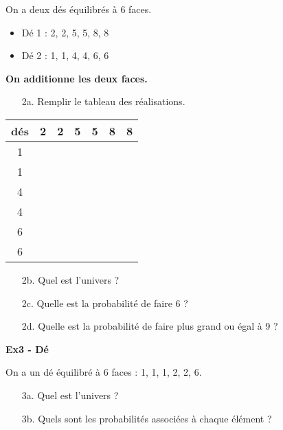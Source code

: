 \begin{multicols}{2}\noindent
On a deux dés équilibrés à 6 faces. 

\begin{itemize}[label={$\bullet$}]
  \item Dé 1 : 2, 2, 5, 5, 8, 8
  \item Dé 2 : 1, 1, 4, 4, 6, 6 
\end{itemize} 

\textbf{On additionne les deux faces.} 
\begin{enumerate}
  \item[2a.] Remplir le tableau des réalisations.
\end{enumerate}  
\columnbreak 

\begin{center}\begin{tabular}{|c|c|c|c|c|c|c|} \hline
  dés & 2 & 2 & 5 & 5 & 8 & 8 \\  \hline
    1 &   &   &   &   &   &   \\  \hline
    1 &   &   &   &   &   &   \\  \hline
    4 &   &   &   &   &   &   \\  \hline
    4 &   &   &   &   &   &   \\  \hline
    6 &   &   &   &   &   &   \\  \hline
    6 &   &   &   &   &   &   \\  \hline
\end{tabular}\end{center}

\end{multicols}

\begin{enumerate}
  \item[2b.] Quel est l'univers ? \\ \Pointilles[2] 
  \item[2c.] Quelle est la probabilité de faire 6 ? \\ \Pointilles[2] 
  \item[2d.] Quelle est la probabilité de faire plus grand ou égal à 9 ? \\ \Pointilles[3]  
\end{enumerate}  

\textbf{Ex3 - Dé}

On a un dé équilibré à 6 faces : 1, 1, 1, 2, 2, 6.

\begin{enumerate}
  \item[3a.] Quel est l'univers ? \\ \Pointilles[2]
  \item[3b.] Quels sont les probabilités associées à chaque élément ? \\ \Pointilles[3]
\end{enumerate}  

